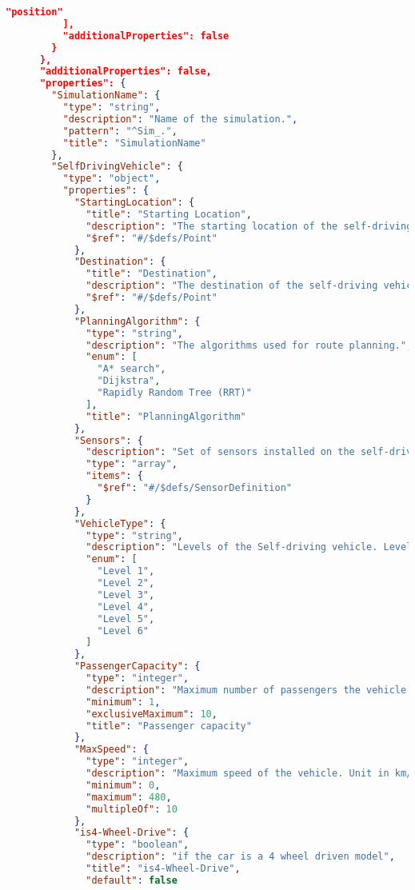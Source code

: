 \begin{lstlisting}[language=json,firstnumber=1]
            "position"
          ],
          "additionalProperties": false
        }
      },
      "additionalProperties": false,
      "properties": {
        "SimulationName": {
          "type": "string",
          "description": "Name of the simulation.",
          "pattern": "^Sim_.",
          "title": "SimulationName"
        },
        "SelfDrivingVehicle": {
          "type": "object",
          "properties": {
            "StartingLocation": {
              "title": "Starting Location",
              "description": "The starting location of the self-driving vehicle.",
              "$ref": "#/$defs/Point"
            },
            "Destination": {
              "title": "Destination",
              "description": "The destination of the self-driving vehicle.",
              "$ref": "#/$defs/Point"
            },
            "PlanningAlgorithm": {
              "type": "string",
              "description": "The algorithms used for route planning.",
              "enum": [
                "A* search",
                "Dijkstra",
                "Rapidly Random Tree (RRT)"
              ],
              "title": "PlanningAlgorithm"
            },
            "Sensors": {
              "description": "Set of sensors installed on the self-driving vehicle.",
              "type": "array",
              "items": {
                "$ref": "#/$defs/SensorDefinition"
              }
            },
            "VehicleType": {
              "type": "string",
              "description": "Levels of the Self-driving vehicle. Level 1 is the lowest level of automation and Level 6 is the highest level of automation.",
              "enum": [
                "Level 1",
                "Level 2",
                "Level 3",
                "Level 4",
                "Level 5",
                "Level 6"
              ]
            },
            "PassengerCapacity": {
              "type": "integer",
              "description": "Maximum number of passengers the vehicle can carry.",
              "minimum": 1,
              "exclusiveMaximum": 10,
              "title": "Passenger capacity"
            },
            "MaxSpeed": {
              "type": "integer",
              "description": "Maximum speed of the vehicle. Unit in km/h. Must be a multiple of 10.",
              "minimum": 0,
              "maximum": 480,
              "multipleOf": 10
            },
            "is4-Wheel-Drive": {
              "type": "boolean",
              "description": "if the car is a 4 wheel driven model",
              "title": "is4-Wheel-Drive",
              "default": false

\end{lstlisting}
